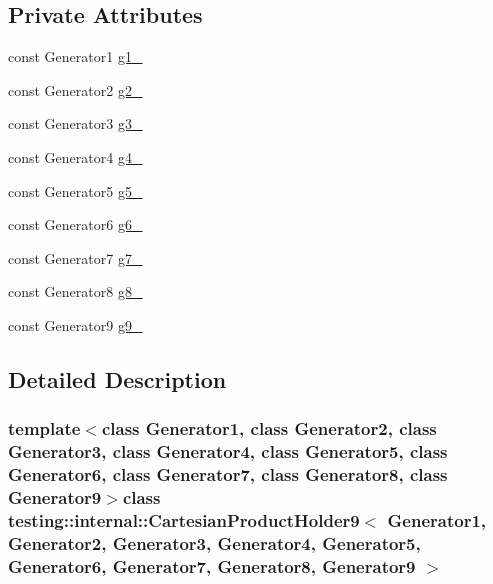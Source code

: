 \subsection*{\-Private \-Attributes}
\begin{DoxyCompactItemize}
\item 
const \-Generator1 \hyperlink{classtesting_1_1internal_1_1CartesianProductHolder9_a36a04c8f9e515291d6a093ab378084f7}{g1\-\_\-}
\item 
const \-Generator2 \hyperlink{classtesting_1_1internal_1_1CartesianProductHolder9_a6cfd9fa9a396d07747d5ebb1f05c7f22}{g2\-\_\-}
\item 
const \-Generator3 \hyperlink{classtesting_1_1internal_1_1CartesianProductHolder9_a79088ad1a5d8e0e316bd20057b9cfb3f}{g3\-\_\-}
\item 
const \-Generator4 \hyperlink{classtesting_1_1internal_1_1CartesianProductHolder9_afdb77af6126bc058715b1304ec0cc727}{g4\-\_\-}
\item 
const \-Generator5 \hyperlink{classtesting_1_1internal_1_1CartesianProductHolder9_ac153ca256cc6aabca132e9276e0b7e80}{g5\-\_\-}
\item 
const \-Generator6 \hyperlink{classtesting_1_1internal_1_1CartesianProductHolder9_ac5367ac6ea4b99933483d6181bace5c2}{g6\-\_\-}
\item 
const \-Generator7 \hyperlink{classtesting_1_1internal_1_1CartesianProductHolder9_afceade55d34273936f6cb3d7e4833d1b}{g7\-\_\-}
\item 
const \-Generator8 \hyperlink{classtesting_1_1internal_1_1CartesianProductHolder9_a33efc612232313b29b814adcffee62e6}{g8\-\_\-}
\item 
const \-Generator9 \hyperlink{classtesting_1_1internal_1_1CartesianProductHolder9_ab18e76dd6bb0c7782e0fc18c04b82063}{g9\-\_\-}
\end{DoxyCompactItemize}


\subsection{\-Detailed \-Description}
\subsubsection*{template$<$class Generator1, class Generator2, class Generator3, class Generator4, class Generator5, class Generator6, class Generator7, class Generator8, class Generator9$>$class testing\-::internal\-::\-Cartesian\-Product\-Holder9$<$ Generator1, Generator2, Generator3, Generator4, Generator5, Generator6, Generator7, Generator8, Generator9 $>$}



